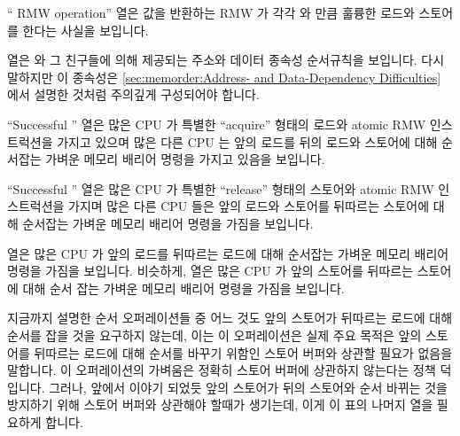 {{	\fi

	`` RMW operation'' 열은 값을 반환하는 
	RMW 가 각각  와  만큼 훌륭한 로드와
	스토어를 한다는 사실을 보입니다.

	 열은  와 그 친구들에 의해
	제공되는 주소와 데이터 종속성 순서규칙을 보입니다.
	다시 말하지만 이 종속성은
	\cref{sec:memorder:Address- and Data-Dependency Difficulties} 에서
	설명한 것처럼 주의깊게 구성되어야 합니다.

	``Successful '' 열은 많은 CPU 가 특별한 ``acquire''
	형태의 로드와 atomic RMW 인스트럭션을 가지고 있으며 많은 다른 CPU 는
	앞의 로드를 뒤의 로드와 스토어에 대해 순서잡는 가벼운 메모리 배리어
	명령을 가지고 있음을 보입니다.

	``Successful '' 열은 많은 CPU 가 특별한 ``release''
	형태의 스토어와 atomic RMW 인스트럭션을 가지며 많은 다른 CPU 들은 앞의
	로드와 스토어를 뒤따르는 스토어에 대해 순서잡는 가벼운 메모리 배리어
	명령을 가짐을 보입니다.

	 열은 많은 CPU 가 앞의 로드를 뒤따르는 로드에 대해
	순서잡는 가벼운 메모리 배리어 명령을 가짐을 보입니다.
	비슷하게,  열은 많은 CPU 가 앞의 스토어를 뒤따르는
	스토어에 대해 순서 잡는 가벼운 메모리 배리어 명령을 가짐을 보입니다.

	지금까지 설명한 순서 오퍼레이션들 중 어느 것도 앞의 스토어가 뒤따르는
	로드에 대해 순서를 잡을 것을 요구하지 않는데, 이는 이 오퍼레이션은 실제
	주요 목적은 앞의 스토어를 뒤따르는 로드에 대해 순서를 바꾸기 위함인
	스토어 버퍼와 상관할 필요가 없음을 말합니다.
	이 오퍼레이션의 가벼움은 정확히 스토어 버퍼에 상관하지 않는다는 정책
	덕입니다.
	그러나, 앞에서 이야기 되었듯 앞의 스토어가 뒤의 스토어와 순서 바뀌는
	것을 방지하기 위해 스토어 버퍼와 상관해야 할때가 생기는데, 이게 이 표의
	나머지 열을 필요하게 합니다.

}}
